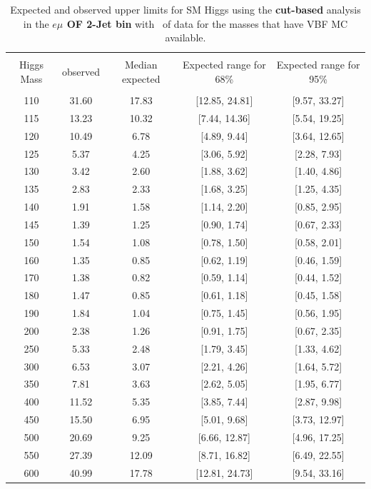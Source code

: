 \begin{table}[hbp!]
\begin{center}
\begin{tabular}{c c c c c}
\hline
\vspace{-3mm} && \\
 Higgs Mass & observed  & Median expected & Expected range for 68\% & Expected range for 95\%   \\
\vspace{-3mm} && \\
\hline
110 & 31.60 & 17.83 & [12.85, 24.81] & [9.57, 33.27] \\
115 & 13.23 & 10.32 & [7.44, 14.36] & [5.54, 19.25] \\
120 & 10.49 & 6.78 & [4.89, 9.44] & [3.64, 12.65] \\
125 & 5.37 & 4.25 & [3.06, 5.92] & [2.28, 7.93] \\
130 & 3.42 & 2.60 & [1.88, 3.62] & [1.40, 4.86] \\
135 & 2.83 & 2.33 & [1.68, 3.25] & [1.25, 4.35] \\
140 & 1.91 & 1.58 & [1.14, 2.20] & [0.85, 2.95] \\
145 & 1.39 & 1.25 & [0.90, 1.74] & [0.67, 2.33] \\
150 & 1.54 & 1.08 & [0.78, 1.50] & [0.58, 2.01] \\
160 & 1.35 & 0.85 & [0.62, 1.19] & [0.46, 1.59] \\
170 & 1.38 & 0.82 & [0.59, 1.14] & [0.44, 1.52] \\
180 & 1.47 & 0.85 & [0.61, 1.18] & [0.45, 1.58] \\
190 & 1.84 & 1.04 & [0.75, 1.45] & [0.56, 1.95] \\
200 & 2.38 & 1.26 & [0.91, 1.75] & [0.67, 2.35] \\
250 & 5.33 & 2.48 & [1.79, 3.45] & [1.33, 4.62] \\
300 & 6.53 & 3.07 & [2.21, 4.26] & [1.64, 5.72] \\
350 & 7.81 & 3.63 & [2.62, 5.05] & [1.95, 6.77] \\
400 & 11.52 & 5.35 & [3.85, 7.44] & [2.87, 9.98] \\
450 & 15.50 & 6.95 & [5.01, 9.68] & [3.73, 12.97] \\
500 & 20.69 & 9.25 & [6.66, 12.87] & [4.96, 17.25] \\
550 & 27.39 & 12.09 & [8.71, 16.82] & [6.49, 22.55] \\
600 & 40.99 & 17.78 & [12.81, 24.73] & [9.54, 33.16] \\
\hline
\end{tabular}
\caption{Expected and observed upper limits for SM Higgs using the
  {\bf cut-based} analysis in the {\bf $e\mu$ OF 2-Jet bin} with \intlumiEightTeV\ of data
 for the masses that have VBF MC available. }
\label{tab:cutbase_uls_2jof}
\end{center}
\end{table}
